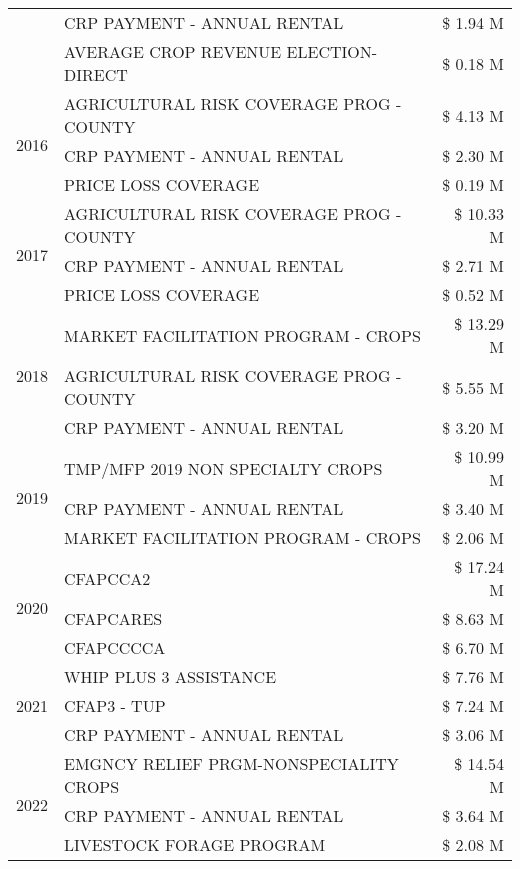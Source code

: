 \begin{tabular}{llr}
 & CRP PAYMENT - ANNUAL RENTAL & \$ 1.94 M \\
 & AVERAGE CROP REVENUE ELECTION-DIRECT & \$ 0.18 M \\
\cline{1-3}
\multirow[t]{3}{*}{2016} & AGRICULTURAL RISK COVERAGE PROG - COUNTY & \$ 4.13 M \\
 & CRP PAYMENT - ANNUAL RENTAL & \$ 2.30 M \\
 & PRICE LOSS COVERAGE & \$ 0.19 M \\
\cline{1-3}
\multirow[t]{3}{*}{2017} & AGRICULTURAL RISK COVERAGE PROG - COUNTY & \$ 10.33 M \\
 & CRP PAYMENT - ANNUAL RENTAL & \$ 2.71 M \\
 & PRICE LOSS COVERAGE & \$ 0.52 M \\
\cline{1-3}
\multirow[t]{3}{*}{2018} & MARKET FACILITATION PROGRAM - CROPS & \$ 13.29 M \\
 & AGRICULTURAL RISK COVERAGE PROG - COUNTY & \$ 5.55 M \\
 & CRP PAYMENT - ANNUAL RENTAL & \$ 3.20 M \\
\cline{1-3}
\multirow[t]{3}{*}{2019} & TMP/MFP 2019 NON SPECIALTY CROPS & \$ 10.99 M \\
 & CRP PAYMENT - ANNUAL RENTAL & \$ 3.40 M \\
 & MARKET FACILITATION PROGRAM - CROPS & \$ 2.06 M \\
\cline{1-3}
\multirow[t]{3}{*}{2020} & CFAPCCA2 & \$ 17.24 M \\
 & CFAPCARES & \$ 8.63 M \\
 & CFAPCCCCA & \$ 6.70 M \\
\cline{1-3}
\multirow[t]{3}{*}{2021} & WHIP PLUS 3 ASSISTANCE & \$ 7.76 M \\
 & CFAP3 - TUP & \$ 7.24 M \\
 & CRP PAYMENT - ANNUAL RENTAL & \$ 3.06 M \\
\cline{1-3}
\multirow[t]{3}{*}{2022} & EMGNCY RELIEF PRGM-NONSPECIALITY CROPS & \$ 14.54 M \\
 & CRP PAYMENT - ANNUAL RENTAL & \$ 3.64 M \\
 & LIVESTOCK FORAGE PROGRAM & \$ 2.08 M \\
\cline{1-3}
\bottomrule
\end{tabular}
